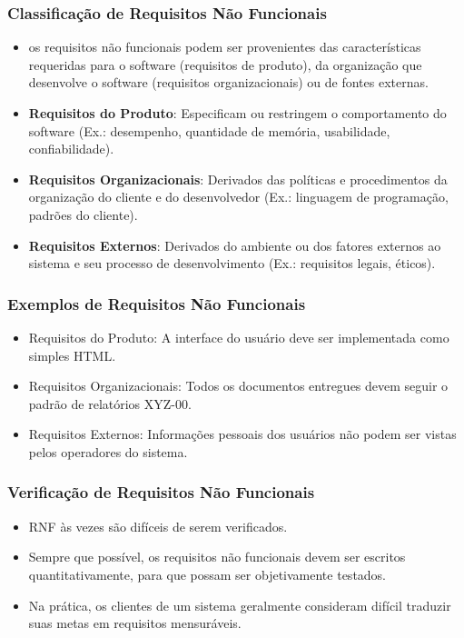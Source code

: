 \documentclass[a4paper, 11pt]{article}
\begin{document}
\subsubsection{Classificação de Requisitos Não Funcionais}
\begin{itemize}
	\item os requisitos não funcionais podem ser provenientes das características requeridas para o software (requisitos de produto),
	da organização que desenvolve o software (requisitos organizacionais) ou de fontes externas.
	\item \textbf{Requisitos do Produto}: Especificam ou restringem o comportamento do software (Ex.: desempenho, quantidade de memória, usabilidade, confiabilidade).
	\item \textbf{Requisitos Organizacionais}: Derivados das políticas e procedimentos da organização do cliente e do desenvolvedor 
	(Ex.: linguagem de programação, padrões do cliente).
	\item \textbf{Requisitos Externos}: Derivados do ambiente ou dos fatores externos ao sistema e seu processo de desenvolvimento (Ex.: requisitos legais, éticos).
\end{itemize}

\subsubsection{Exemplos de Requisitos Não Funcionais}
\begin{itemize}
	\item Requisitos do Produto: A interface do usuário deve ser implementada como simples HTML.
	\item Requisitos Organizacionais: Todos os documentos entregues devem seguir o padrão de relatórios XYZ-00.
	\item Requisitos Externos: Informações pessoais dos usuários não podem ser vistas pelos operadores do sistema.
\end{itemize}


\subsubsection{Verificação de Requisitos Não Funcionais}
\begin{itemize}
	\item RNF às vezes são difíceis de serem verificados.
	\item Sempre que possível, os requisitos não funcionais devem ser escritos quantitativamente, para que possam ser objetivamente testados.
	\item Na prática, os clientes de um sistema geralmente consideram difícil traduzir suas metas em requisitos mensuráveis.
\end{itemize}
\end{document}
